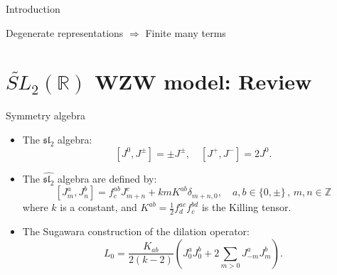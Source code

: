 \documentclass{beamer}
\begin{document}
\begin{frame}{Introduction}
    \begin{block}{}
      \begin{center}
        Degenerate representations $\Longrightarrow $ Finite many terms
      \end{center}
    \end{block}
\end{frame}

\section{\texorpdfstring{$\widetilde{SL}_{2}(\mathbb{R})$}{SL(2,R)} WZW model: Review}

\begin{frame}{Symmetry algebra}
  \begin{itemize}
    \item The $\mathfrak{sl}_{2}$ algebra: 
      \begin{equation*}
        \left[J^{0}, J^{\pm}\right] = \pm J^{\pm}, \quad \left[J^{+}, J^{-}\right] = 2 J^{0}.
      \end{equation*}
    \item The $\widehat{\mathfrak{sl}_{2}}$ algebra are defined by:
      \begin{equation*}
          \left[ J^{a}_{m}, J^{b}_{n} \right] = f^{ab}_{c} J^{c}_{m+n} + k m K^{ab} \delta_{m+n,0}, \quad a,b \in \{0,\pm\} \, ,\,  m,n \in \mathbb{Z}
      \end{equation*}
      where $k$ is a constant, and $K^{ab} = \frac{1}{2} f^{ac}_{d}f^{bd}_{c}$ is the Killing tensor.
    \item The Sugawara construction of the dilation operator:
      \begin{equation*}
        L_{0} = \frac{K_{ab}}{2(k-2)} \left(J^{a}_{0}J^{b}_{0} + 2\sum_{m > 0 } J^{a}_{-m} J^{b}_{m}\right).
      \end{equation*}
  \end{itemize}
\end{frame}
\end{document}
